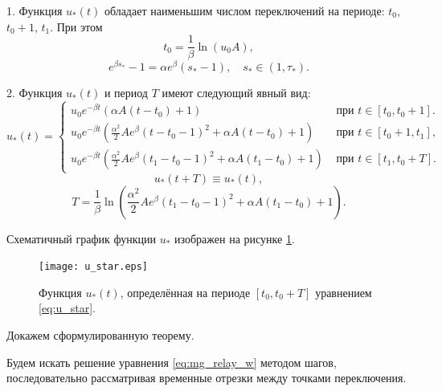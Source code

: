 \begin{theorem}
	1. Функция $u_*(t)$ обладает наименьшим числом переключений на периоде: $t_0$, $t_0+1$, $t_1$. При этом 
	\begin{equation*}
		t_0=\frac{1}{\beta}\ln(u_0 A),
	\end{equation*}
	\begin{equation}
		e^{\beta s_*} - 1=\alpha e^{\beta}(s_* - 1), \quad s_* \in (1, \tau_*).
	\end{equation}
	
	2. Функция $u_*(t)$ и период $T$ имеют следующий явный вид: 
	\small
	\begin{equation}
		\label{eq:u_star}
		u_*(t)=
		\begin{cases}
			u_0 e^{-\beta t}(\alpha A(t-t_0)+1) & \text{ при } t\in[t_0,t_0+1].
			\\
			u_0 e^{-\beta t}\left(\frac{\alpha^2}{2}Ae^{\beta}(t-t_0-1)^2+\alpha A(t-t_0)+1\right) & \text{ при } t\in[t_0+1,t_1],
			\\
			u_0 e^{-\beta t}\left(\frac{\alpha^2}{2}Ae^{\beta}(t_1-t_0-1)^2+\alpha A(t_1-t_0)+1\right) & \text{ при } t\in[t_1,t_0+T].
		\end{cases}
	\end{equation}
	\normalsize
	\[
	u_*(t+T)\equiv u_*(t),
	\]
	\begin{equation}
		\label{eq:mg_period_T}
		T = \dfrac{1}{\beta}\ln\left( \frac{\alpha^2}{2}Ae^{\beta}(t_1-t_0-1)^2+\alpha A(t_1-t_0)+1\right). 
	\end{equation}
\end{theorem}

Схематичный график функции $u_*$ изображен на рисунке \ref{fig:u_star}.
%
\begin{figure}[h]
	\centering
	\texttt{[image: u\_star.eps]}
	\caption{Функция $u_*(t)$, определённая на периоде $[t_0, t_0 + T]$ уравнением \eqref{eq:u_star}.}
	\label{fig:u_star}
\end{figure}

Докажем сформулированную теорему.


Будем искать решение уравнения \eqref{eq:mg_relay_w} методом шагов, последовательно рассматривая временные отрезки между точками переключения. 


